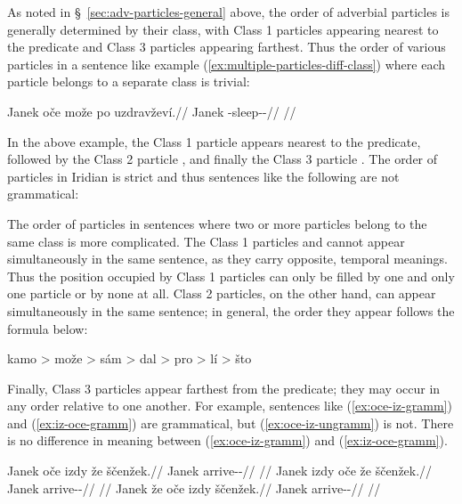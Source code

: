 As noted in \S~\ref{sec:adv-particles-general} above, the order of adverbial
particles is generally determined by their class, with Class 1 particles
appearing nearest to the predicate and Class 3 particles appearing farthest.
Thus the order of various particles in a sentence like example
(\ref{ex:multiple-particles-diff-class}) where each particle belongs to a
separate class is trivial:

\pex\label{ex:multiple-particles-diff-class}
\begingl
	\gla Janek oče može po uzdravževí.//
	\glb Janek \Mir{} \Add{} \Ipfv{} \Refl{}-sleep-\Av{}-\Cont{}//
	\glft {}//
\endgl
\xe

In the above example, the Class 1 particle  appears nearest to the
predicate, followed by the Class 2 particle , and finally the Class 3
particle . The order of particles in Iridian is strict and thus
sentences like the following are not grammatical:

\pex
\a \ljudge{*} 
\a \ljudge{*} 
\a \ljudge{*} 
\a \ljudge{*} 
\a \ljudge{*} 
\xe

The order of particles in sentences where two or more particles belong to the
same class is more complicated. The Class 1 particles  and 
cannot appear simultaneously in the same sentence, as they carry opposite,
temporal meanings. Thus the position occupied by Class 1 particles can only be
filled by one and only one particle or by none at all. Class 2 particles, on the
other hand, can appear simultaneously in the same sentence; in general, the
order they appear follows the formula below:

\pex\label{ex:order-of-class-2-parts}
	{\small
		kamo > može > sám > dal > pro > lí > što
	}
\xe

Finally, Class 3 particles appear farthest from the predicate; they may occur in
any order relative to one another. For example, sentences like
(\ref{ex:oce-iz-gramm}) and (\ref{ex:iz-oce-gramm}) are grammatical, but
(\ref{ex:oce-iz-ungramm}) is not. There is no difference in meaning between
(\ref{ex:oce-iz-gramm}) and (\ref{ex:iz-oce-gramm}).

\pex
\a\label{ex:oce-iz-gramm}
\begingl
	\gla Janek oče izdy že ščenžek.//
	\glb Janek \Mir{} \Infer{} \Pfv{} arrive-\Av{}-\Pf{}//
	\glft {}//
\endgl
\a\label{ex:iz-oce-gramm}
\begingl
	\gla Janek izdy oče že ščenžek.//
	\glb Janek \Infer{} \Mir{} \Pfv{} arrive-\Av{}-\Pf{}//
	\glft {}//
\endgl
\a\label{ex:oce-iz-ungramm}
\begingl
	\gla \ljudge{*}Janek že oče izdy ščenžek.//
	\glb Janek \Pfv{} \Mir{} \Infer{} arrive-\Av{}-\Pf{}//
	\glft {}//
\endgl
\xe

